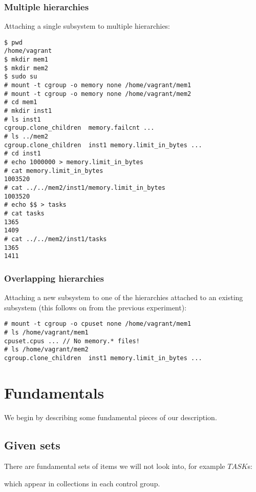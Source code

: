 \documentclass[a4paper,twoside,12pt]{article}
\begin{document}
\subsubsection{Multiple hierarchies}

Attaching a single subsystem to multiple hierarchies:
{\small \begin{verbatim}
$ pwd   
/home/vagrant
$ mkdir mem1
$ mkdir mem2
$ sudo su
# mount -t cgroup -o memory none /home/vagrant/mem1
# mount -t cgroup -o memory none /home/vagrant/mem2
# cd mem1
# mkdir inst1  
# ls inst1 
cgroup.clone_children  memory.failcnt ...
# ls ../mem2
cgroup.clone_children  inst1 memory.limit_in_bytes ...
# cd inst1
# echo 1000000 > memory.limit_in_bytes 
# cat memory.limit_in_bytes 
1003520
# cat ../../mem2/inst1/memory.limit_in_bytes 
1003520
# echo $$ > tasks
# cat tasks
1365
1409
# cat ../../mem2/inst1/tasks
1365
1411
\end{verbatim}}

\subsubsection{Overlapping hierarchies}

Attaching a new subsystem to one of the hierarchies attached to an existing subsystem (this follows on from the previous experiment):
{\small \begin{verbatim}
# mount -t cgroup -o cpuset none /home/vagrant/mem1
# ls /home/vagrant/mem1
cpuset.cpus ... // No memory.* files!
# ls /home/vagrant/mem2
cgroup.clone_children  inst1 memory.limit_in_bytes ...
\end{verbatim}}

\section{Fundamentals}

We begin by describing some fundamental pieces of our description.

\subsection{Given sets}
There are fundamental sets of items we will not look into, for example $TASK$s:
\begin{zed}
[TASK]
\end{zed}
which appear in collections in each control group.
\end{document}
